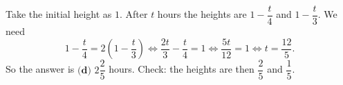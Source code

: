Take the initial height as $1$. After $t$ hours the heights are $1-\dfrac{t}{4}$ and $1-\dfrac{t}{3}$. We need
\[
1-\dfrac{t}{4}=2\left(1-\dfrac{t}{3}\right)\iff \dfrac{2t}{3}-\dfrac{t}{4}=1\iff\dfrac{5t}{12}=1\iff t=\dfrac{12}{5}.
\]
So the answer is $\boxed{\textbf{(d) }2\dfrac{2}{5}}$ hours. Check: the heights are then $\dfrac{2}{5}$ and $\dfrac{1}{5}$.
